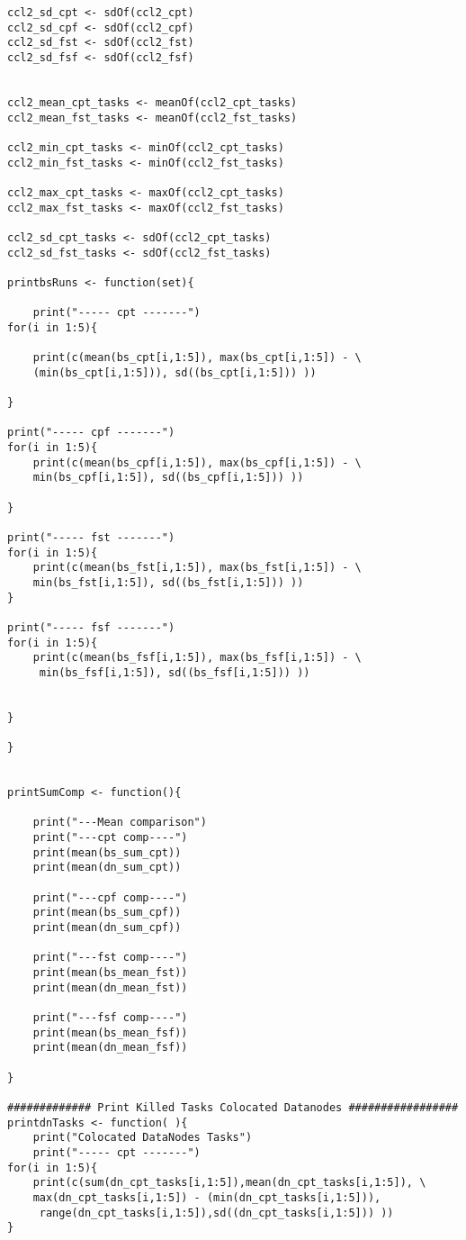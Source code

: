 \begin{verbatim}
ccl2_sd_cpt <- sdOf(ccl2_cpt)
ccl2_sd_cpf <- sdOf(ccl2_cpf)
ccl2_sd_fst <- sdOf(ccl2_fst)
ccl2_sd_fsf <- sdOf(ccl2_fsf)


ccl2_mean_cpt_tasks <- meanOf(ccl2_cpt_tasks)
ccl2_mean_fst_tasks <- meanOf(ccl2_fst_tasks)

ccl2_min_cpt_tasks <- minOf(ccl2_cpt_tasks)
ccl2_min_fst_tasks <- minOf(ccl2_fst_tasks)

ccl2_max_cpt_tasks <- maxOf(ccl2_cpt_tasks)
ccl2_max_fst_tasks <- maxOf(ccl2_fst_tasks)

ccl2_sd_cpt_tasks <- sdOf(ccl2_cpt_tasks)
ccl2_sd_fst_tasks <- sdOf(ccl2_fst_tasks)

printbsRuns <- function(set){

	print("----- cpt -------")
for(i in 1:5){

	print(c(mean(bs_cpt[i,1:5]), max(bs_cpt[i,1:5]) - \
	(min(bs_cpt[i,1:5])), sd((bs_cpt[i,1:5])) ))
	
}

print("----- cpf -------")
for(i in 1:5){
	print(c(mean(bs_cpf[i,1:5]), max(bs_cpf[i,1:5]) - \
	min(bs_cpf[i,1:5]), sd((bs_cpf[i,1:5])) ))

}

print("----- fst -------")
for(i in 1:5){
	print(c(mean(bs_fst[i,1:5]), max(bs_fst[i,1:5]) - \
	min(bs_fst[i,1:5]), sd((bs_fst[i,1:5])) ))
}

print("----- fsf -------")
for(i in 1:5){
	print(c(mean(bs_fsf[i,1:5]), max(bs_fsf[i,1:5]) - \
	 min(bs_fsf[i,1:5]), sd((bs_fsf[i,1:5])) ))
	

}

}

	
printSumComp <- function(){

	print("---Mean comparison")
	print("---cpt comp----")
	print(mean(bs_sum_cpt))
	print(mean(dn_sum_cpt))

	print("---cpf comp----")
	print(mean(bs_sum_cpf))
	print(mean(dn_sum_cpf))

	print("---fst comp----")
	print(mean(bs_mean_fst))
	print(mean(dn_mean_fst))

	print("---fsf comp----")
	print(mean(bs_mean_fsf))
	print(mean(dn_mean_fsf))

}

############# Print Killed Tasks Colocated Datanodes #################
printdnTasks <- function( ){
	print("Colocated DataNodes Tasks")
	print("----- cpt -------")
for(i in 1:5){
	print(c(sum(dn_cpt_tasks[i,1:5]),mean(dn_cpt_tasks[i,1:5]), \
	max(dn_cpt_tasks[i,1:5]) - (min(dn_cpt_tasks[i,1:5])),
	 range(dn_cpt_tasks[i,1:5]),sd((dn_cpt_tasks[i,1:5])) ))
}


\end{verbatim}
